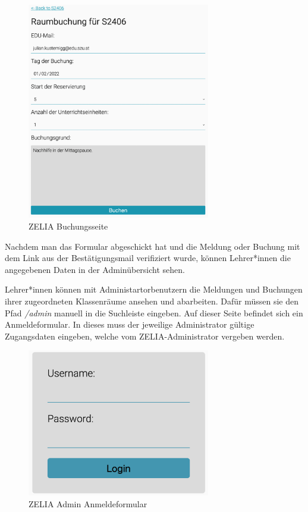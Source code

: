\begin{figure}[H]
    \centering
    \includegraphics[width=80mm]{media/WebComponents/Buchungsseite_light.png}
    \caption{ZELIA Buchungsseite}
\end{figure}

Nachdem man das Formular abgeschickt hat und die Meldung oder Buchung mit dem Link aus der Bestätigungsmail verifiziert wurde, können Lehrer*innen die angegebenen Daten in der Adminübersicht sehen.


Lehrer*innen können mit Administartorbenutzern die Meldungen und Buchungen ihrer zugeordneten Klassenräume ansehen und abarbeiten. Dafür müssen sie den Pfad \emph{/admin} manuell in die Suchleiste eingeben. Auf dieser Seite befindet sich ein Anmeldeformular. In dieses muss der jeweilige Administrator gültige Zugangsdaten eingeben, welche vom ZELIA-Administrator vergeben werden. 

\begin{figure}[H]
    \centering
    \includegraphics[width=80mm]{media/WebComponents/Login_light.png}
    \caption{ZELIA Admin Anmeldeformular}
\end{figure}

